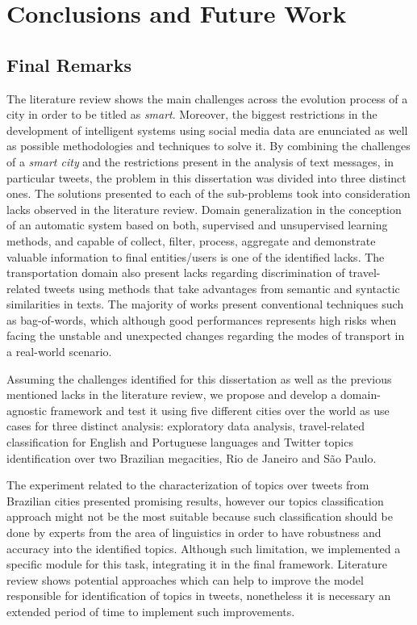 \chapter{Conclusions and Future Work} \label{chap:conclusions}

\minitoc \mtcskip \noindent

\iffalse
\section{Final Remarks}

The literature review shows the main challenges across the evolution process of a city in order to be titled as \textit{smart}. Moreover, the biggest restrictions in the development of intelligent systems using social media data are enunciated as well as possible methodologies and techniques to solve it. By combining the challenges of a \textit{smart city} and the restrictions present in the analysis of text messages, in particular tweets, the problem in this dissertation was divided into three distinct ones. The solutions presented to each of the sub-problems took into consideration lacks observed in the literature review. Domain generalization in the conception of an automatic system based on both, supervised and unsupervised learning methods, and capable of collect, filter, process, aggregate and demonstrate valuable information to final entities/users is one of the identified lacks. The transportation domain also present lacks regarding discrimination of travel-related tweets using methods that take advantages from semantic and syntactic similarities in texts. The majority of works present conventional techniques such as bag-of-words, which although good performances represents high risks when facing the unstable and unexpected changes regarding the modes of transport in a real-world scenario.

Assuming the challenges identified for this dissertation as well as the previous mentioned lacks in the literature review, we propose and develop a domain-agnostic framework and test it using five different cities over the world as use cases for three distinct analysis: exploratory data analysis, travel-related classification for English and Portuguese languages and Twitter topics identification over two Brazilian megacities, Rio de Janeiro and São Paulo.

The experiment related to the characterization of topics over tweets from Brazilian cities presented promising results, however our topics classification approach might not be the most suitable because such classification should be done by experts from the area of linguistics in order to have robustness and accuracy into the identified topics. Although such limitation, we implemented a specific module for this task, integrating it in the final framework. Literature review shows potential approaches which can help to improve the model responsible for identification of topics in tweets, nonetheless it is necessary an extended period of time to implement such improvements.


